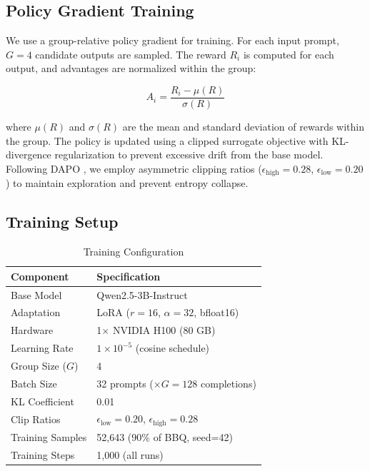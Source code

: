 \documentclass[conference]{IEEEtran}
\begin{document}
\subsection{Policy Gradient Training}

We use a group-relative policy gradient \cite{deepseekmath} for training. For each input prompt, $G = 4$ candidate outputs are sampled. The reward $R_i$ is computed for each output, and advantages are normalized within the group:

\begin{equation}
A_i = \frac{R_i - \mu(R)}{\sigma(R)}
\label{eq:advantage}
\end{equation}

\noindent where $\mu(R)$ and $\sigma(R)$ are the mean and standard deviation of rewards within the group. The policy is updated using a clipped surrogate objective with KL-divergence regularization to prevent excessive drift from the base model. Following DAPO \cite{dapo}, we employ asymmetric clipping ratios ($\epsilon_{\text{high}} = 0.28$, $\epsilon_{\text{low}} = 0.20$) to maintain exploration and prevent entropy collapse.

\subsection{Training Setup}

\begin{table}[htbp]
\caption{Training Configuration}
\begin{center}
\begin{tabular}{ll}
\toprule
\textbf{Component} & \textbf{Specification} \\
\midrule
Base Model & Qwen2.5-3B-Instruct \cite{qwen25} \\
Adaptation & LoRA \cite{lora} ($r=16$, $\alpha=32$, bfloat16) \\
Hardware & 1$\times$ NVIDIA H100 (80 GB) \\
Learning Rate & $1 \times 10^{-5}$ (cosine schedule) \\
Group Size ($G$) & 4 \\
Batch Size & 32 prompts ($\times G = 128$ completions) \\
KL Coefficient & 0.01 \\
Clip Ratios & $\epsilon_{\text{low}}=0.20$, $\epsilon_{\text{high}}=0.28$ \\
Training Samples & 52,643 (90\% of BBQ, seed=42) \\
Training Steps & 1,000 (all runs) \\
\bottomrule
\end{tabular}
\label{tab:config}
\end{center}
\end{table}
\end{document}
